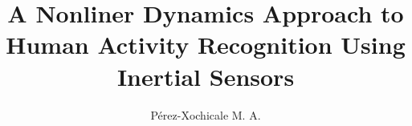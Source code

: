\documentclass{sigchi}
\begin{document}
\title{A Nonliner Dynamics Approach to Human Activity Recognition Using
Inertial Sensors}

\author{
  \alignauthor P\'erez-Xochicale M. A.\\
    \\
     \\
}

\maketitle
\end{document}
